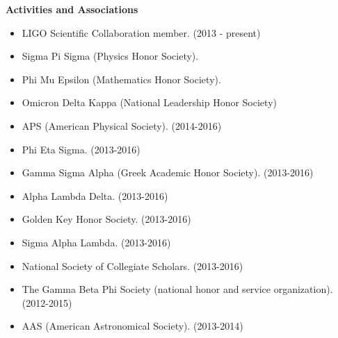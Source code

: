 {\bf{Activities and Associations}}\\
\begin{itemize}
\setlength\itemsep{0em}
\item LIGO Scientific Collaboration member. (2013 - present)
\item Sigma Pi Sigma (Physics Honor Society).
\item Phi Mu Epsilon (Mathematics Honor Society).
\item Omicron Delta Kappa (National Leadership Honor Society)
\item APS (American Physical Society). (2014-2016)
\item Phi Eta Sigma. (2013-2016)
\item Gamma Sigma Alpha (Greek Academic Honor Society). (2013-2016)
\item Alpha Lambda Delta. (2013-2016)
\item Golden Key Honor Society. (2013-2016)
\item Sigma Alpha Lambda. (2013-2016)
\item National Society of Collegiate Scholars. (2013-2016)
\item The Gamma Beta Phi Society (national honor and service organization). (2012-2015)
\item AAS (American Astronomical Society). (2013-2014)
\end{itemize}

\endinput